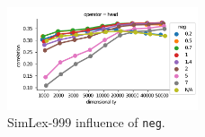 \begin{figure}[h]
  \centering

  \includegraphics[width=0.5\textwidth]{supplement/figures/SimLex999-interaction-neg}

  \caption{SimLex-999 influence of \texttt{neg}.}
  \label{fig:SimLex999-neg}
\end{figure}
